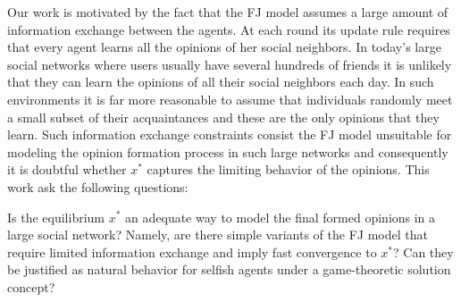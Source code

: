 Our work is motivated by the fact that the FJ model assumes a large amount of
information exchange between the agents. At each round its update rule requires
that every agent learns all the opinions of her social neighbors.  In today's
large social networks where users usually have several hundreds of friends it
is unlikely that they can learn the opinions of all their social neighbors each
day.
In such environments it is far more reasonable to assume that individuals randomly
meet a small subset of their acquaintances and these are the only opinions that
they learn.  Such information exchange constraints consist the FJ model
unsuitable for modeling the opinion formation process in such large networks
and consequently it is doubtful whether $x^*$ captures the limiting behavior
of the opinions. This work ask the following questions:
\begin{question}\label{q:motivation1}
Is the equilibrium $x^*$ an adequate way to model
the final formed opinions in a large social network? Namely, are there
simple variants of the FJ model that require limited information exchange and
imply fast convergence to $x^*$? Can they be justified as natural behavior
for selfish agents under a game-theoretic solution concept?
\end{question}

